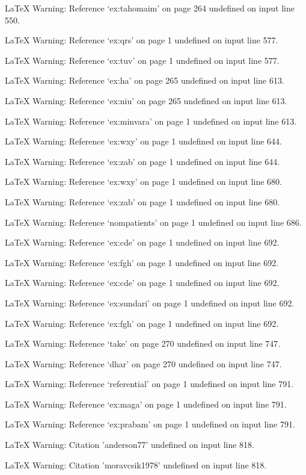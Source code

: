 LaTeX Warning: Reference `ex:tahomaim' on page 264 undefined on input line 550.


LaTeX Warning: Reference `ex:qrs' on page 1 undefined on input line 577.


LaTeX Warning: Reference `ex:tuv' on page 1 undefined on input line 577.


LaTeX Warning: Reference `ex:ha' on page 265 undefined on input line 613.


LaTeX Warning: Reference `ex:niu' on page 265 undefined on input line 613.


LaTeX Warning: Reference `ex:minvara' on page 1 undefined on input line 613.


LaTeX Warning: Reference `ex:wxy' on page 1 undefined on input line 644.


LaTeX Warning: Reference `ex:zab' on page 1 undefined on input line 644.


LaTeX Warning: Reference `ex:wxy' on page 1 undefined on input line 680.


LaTeX Warning: Reference `ex:zab' on page 1 undefined on input line 680.


LaTeX Warning: Reference `nompatients' on page 1 undefined on input line 686.


LaTeX Warning: Reference `ex:cde' on page 1 undefined on input line 692.


LaTeX Warning: Reference `ex:fgh' on page 1 undefined on input line 692.


LaTeX Warning: Reference `ex:cde' on page 1 undefined on input line 692.


LaTeX Warning: Reference `ex:sundari' on page 1 undefined on input line 692.


LaTeX Warning: Reference `ex:fgh' on page 1 undefined on input line 692.


LaTeX Warning: Reference `take' on page 270 undefined on input line 747.


LaTeX Warning: Reference `dhar' on page 270 undefined on input line 747.


LaTeX Warning: Reference `referential' on page 1 undefined on input line 791.


LaTeX Warning: Reference `ex:maga' on page 1 undefined on input line 791.


LaTeX Warning: Reference `ex:prabam' on page 1 undefined on input line 791.


LaTeX Warning: Citation 'anderson77' undefined on input line 818.


LaTeX Warning: Citation 'moravcsik1978' undefined on input line 818.


